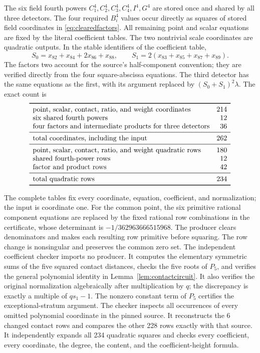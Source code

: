 \documentclass[11pt,a4paper]{article}
\begin{document}
The six field fourth powers $C_1^4,C_2^4,C_3^4,C_4^4,I^4,G^4$
are stored once and shared by all three detectors. The four required
$B_i^4$ values occur directly as squares of stored field
coordinates in \eqref{eq:clearedfactors}. All remaining point and
scalar equations are fixed by the literal coefficient tables.
The two nontrivial scale coordinates are quadratic outputs. In the
stable identifiers of the coefficient table,
\[
 S_0=x_{82}+x_{84}+2x_{86}+x_{88},\qquad
 S_1=2(x_{83}+x_{85}+x_{87}+x_{89}).
\]
The factors two account for the source's half-component convention;
they are verified directly from the four square-abscissa equations.
The third detector has the same equations as the first, with its
argument replaced by $(S_0+S_1)^2\lambda$.
The exact count is
\[
\begin{array}{lr}\toprule
\text{point, scalar, contact, ratio, and weight coordinates}&214\\
\text{six shared fourth powers}&12\\
\text{four factors and intermediate products for three detectors}&36\\\midrule
\text{total coordinates, including the input}&262\\\midrule
\text{point, scalar, contact, ratio, and weight quadratic rows}&180\\
\text{shared fourth-power rows}&12\\
\text{factor and product rows}&42\\\midrule
\text{total quadratic rows}&234\\\bottomrule
\end{array}
\]

The complete tables fix every coordinate, equation, coefficient, and
normalization; the input is coordinate one. For the common point,
the six primitive rational component equations are replaced by the
fixed rational row combinations in the certificate, whose determinant
is $-1/362963666515968$. The producer clears denominators and makes
each resulting row primitive before squaring. The row change is
nonsingular and preserves the common zero set.
The independent coefficient checker imports no producer. It computes
the elementary symmetric sums of the five squared contact distances,
checks the five roots of $P_5$, and verifies the general polynomial
identity in Lemma~\ref{lem:contactcircuit}. It also verifies the
original normalization algebraically after multiplication by $q$;
the discrepancy is exactly a multiple of $qs_1-1$. The nonzero
constant term of $P_5$ certifies the exceptional-stratum argument.
The checker inspects all occurrences of every omitted polynomial
coordinate in the pinned source. It reconstructs the 6 changed
contact rows and compares the other 228 rows exactly with that
source. It independently expands all 234 quadratic squares and
checks every coefficient, every coordinate, the degree, the content,
and the coefficient-height formula.
\end{document}
